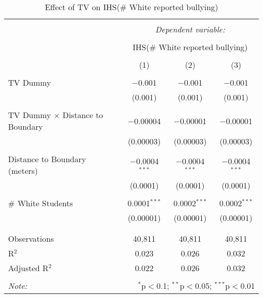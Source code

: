 
\begin{table}[!htbp] \centering 
  \caption{Effect of TV on IHS(\# White reported bullying)} 
  \label{} 
\begin{tabular}{@{\extracolsep{-2pt}}lccc} 
\\[-1.8ex]\hline 
\hline \\[-1.8ex] 
 & \multicolumn{3}{c}{\textit{Dependent variable:}} \\ 
\cline{2-4} 
\\[-1.8ex] & \multicolumn{3}{c}{IHS(\# White reported bullying)} \\ 
\\[-1.8ex] & (1) & (2) & (3)\\ 
\hline \\[-1.8ex] 
 TV Dummy & $-$0.001 & $-$0.001 & $-$0.001 \\ 
  & (0.001) & (0.001) & (0.001) \\ 
  & & & \\ 
 TV Dummy $\times$ Distance to Boundary & $-$0.00004 & $-$0.00001 & $-$0.00001 \\ 
  & (0.00003) & (0.00003) & (0.00003) \\ 
  & & & \\ 
 Distance to Boundary (meters) & $-$0.0004$^{***}$ & $-$0.0004$^{***}$ & $-$0.0004$^{***}$ \\ 
  & (0.0001) & (0.0001) & (0.0001) \\ 
  & & & \\ 
 \# White Students & 0.0001$^{***}$ & 0.0002$^{***}$ & 0.0002$^{***}$ \\ 
  & (0.00001) & (0.00001) & (0.00001) \\ 
  & & & \\ 
\hline \\[-1.8ex] 
Observations & 40,811 & 40,811 & 40,811 \\ 
R$^{2}$ & 0.023 & 0.026 & 0.032 \\ 
Adjusted R$^{2}$ & 0.022 & 0.026 & 0.032 \\ 
\hline 
\hline \\[-1.8ex] 
\textit{Note:}  & \multicolumn{3}{r}{$^{*}$p$<$0.1; $^{**}$p$<$0.05; $^{***}$p$<$0.01} \\ 
\end{tabular} 
\end{table} 
